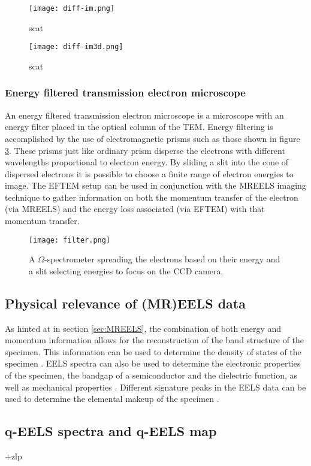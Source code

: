 \begin{figure}
	\centering
	\texttt{[image: diff-im.png]}
	\caption{scat}
	\label{fig:diff-im}
\end{figure}
\begin{figure}
	\centering
	\texttt{[image: diff-im3d.png]}
	\caption{scat}
	\label{fig:diff-im3d}
\end{figure}
\subsubsection{Energy filtered transmission electron microscope}
\label{sec:eftem}
An energy filtered transmission electron microscope is a microscope with an energy filter placed in the optical column of the TEM. Energy filtering is accomplished by the use of electromagnetic prisms such as those shown in figure \ref{fig:filter}.
These prisms just like ordinary prism disperse the electrons with different wavelengths proportional to electron energy. By sliding a slit into the cone of dispersed electrons it is possible to choose a finite range of electron energies to image.
The EFTEM setup can be used in conjunction with the MREELS imaging technique to gather information on both the momentum transfer of the electron (via MREELS) and the energy loss associated (via EFTEM) with that momentum transfer.

\begin{figure}
	\centering
	\texttt{[image: filter.png]}
	\caption{A $\Omega$-spectrometer spreading the electrons based on their energy and a slit selecting energies to focus on the CCD camera.}
	\label{fig:filter}
\end{figure}


\subsection{Physical relevance of (MR)EELS data}
As hinted at in section \ref{sec:MREELS}, the combination of both energy and momentum information allows for the reconstruction of the band structure of the specimen. This information can be used to determine the density of states of the specimen \cite{doi:10.1021/acs.nanolett.9b03928} \cite{Egerton_2008}.
EELS spectra can also be used to determine the electronic properties of the specimen, the bandgap of a semiconductor and the dielectric function, as well as mechanical properties \cite{Egerton_2008}.
Different signature peaks in the EELS data can be used to determine the elemental makeup of the specimen \cite{Egerton_2008}.

\subsection{q-EELS spectra and q-EELS map}
+zlp
